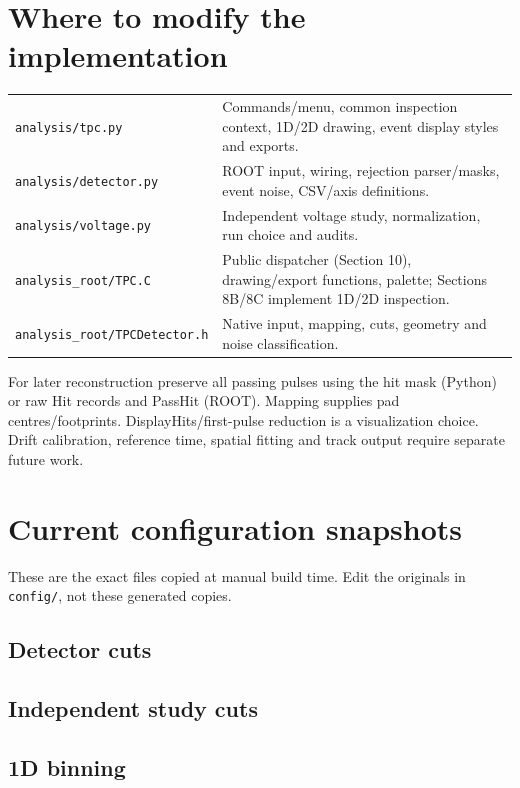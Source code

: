 \documentclass[11pt,a4paper]{article}
\begin{document}
\section{Where to modify the implementation}
\begin{longtable}{p{.33\linewidth}p{.6\linewidth}}
\texttt{analysis/tpc.py} & Commands/menu, common inspection context, 1D/2D drawing, event display styles and exports.\\
\texttt{analysis/detector.py} & ROOT input, wiring, rejection parser/masks, event noise, CSV/axis definitions.\\
\texttt{analysis/voltage.py} & Independent voltage study, normalization, run choice and audits.\\
\texttt{analysis\_root/TPC.C} & Public dispatcher (Section 10), drawing/export functions, palette; Sections 8B/8C implement 1D/2D inspection.\\
\texttt{analysis\_root/TPCDetector.h} & Native input, mapping, cuts, geometry and noise classification.\\
\end{longtable}
For later reconstruction preserve all passing pulses using the hit mask (Python)
or raw Hit records and PassHit (ROOT). Mapping supplies pad centres/footprints.
DisplayHits/first-pulse reduction is a visualization choice. Drift calibration,
reference time, spatial fitting and track output require separate future work.

\clearpage\appendix
\section{Current configuration snapshots}
These are the exact files copied at manual build time. Edit the originals in
\texttt{config/}, not these generated copies.
\subsection{Detector cuts}

\subsection{Independent study cuts}

\subsection{1D binning}

\end{document}
